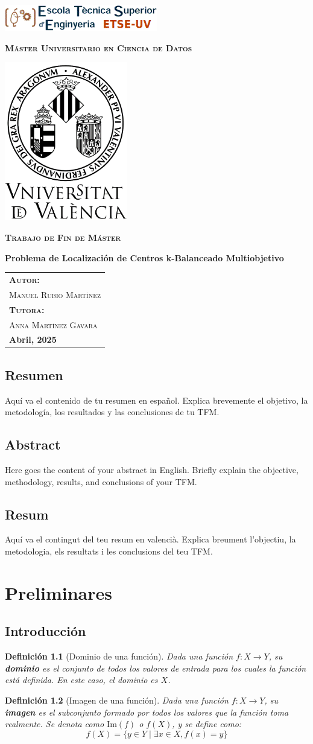 \documentclass[12pt,a4paper]{book}
\newtheorem{defi}{Definición}[section]
\newcommand{\nuevaportada}[6]{
    \thispagestyle{empty}
    \begin{center}
        \includegraphics[width=0.5\textwidth]{images/logo.png}
        
        \vspace{0.3cm} %
        {\Large\bfseries\textsc{M\'aster Universitario en #1}\par}
        
        \vspace{0.3cm} %
        \includegraphics[width=0.4\textwidth]{images/uv.png}
        
        \vspace{0.3cm} %
        {\Large\bfseries\textsc{Trabajo de Fin de M\'aster}\par}
        
        \vspace{0.5cm} %
        {\Large\bfseries #2\par}
        
        \vspace{1.5cm} %
        \begin{flushright}
            \begin{tabular}{l} 
                {\large\bfseries\textsc{Autor:}} \\
                {\large\textsc{#3}} \\ [0.3cm] %
                {\large\bfseries\textsc{Tutora:}} \\ 
                {\large\textsc{#4}} \\ [0.3cm] %
                {\large\bfseries #5} 
            \end{tabular}
        \end{flushright}
    \end{center}
}
\begin{document}
\nuevaportada{Ciencia de Datos}{Problema de Localización de Centros k-Balanceado Multiobjetivo}{Manuel Rubio Martínez}{Anna Martínez Gavara}{Abril, 2025}

\clearpage

\newpage
\tableofcontents

\newpage

\section*{Resumen}
Aquí va el contenido de tu resumen en español. Explica brevemente el objetivo, la metodología, los resultados y las conclusiones de tu TFM.

\newpage

\section*{Abstract}
Here goes the content of your abstract in English. Briefly explain the objective, methodology, results, and conclusions of your TFM.

\newpage

\section*{Resum}
Aquí va el contingut del teu resum en valencià. Explica breument l'objectiu, la metodologia, els resultats i les conclusions del teu TFM.

\newpage

\chapter{Preliminares}
\section{Introducción}
\begin{defi}[Dominio de una función]
Dada una función $f: X \to Y$, su \textbf{dominio} es el conjunto de todos los valores de entrada para los cuales la función está definida. En este caso, el dominio es $X$.
\end{defi}

\begin{defi}[Imagen de una función]
Dada una función $f: X \to Y$, su \textbf{imagen} es el subconjunto formado por todos los valores que la función toma realmente. Se denota como $\text{Im}(f)$ o $f(X)$, y se define como:
$$ f(X) = \{y \in Y \mid \exists x \in X, f(x) = y \} $$
\end{defi}
\end{document}
